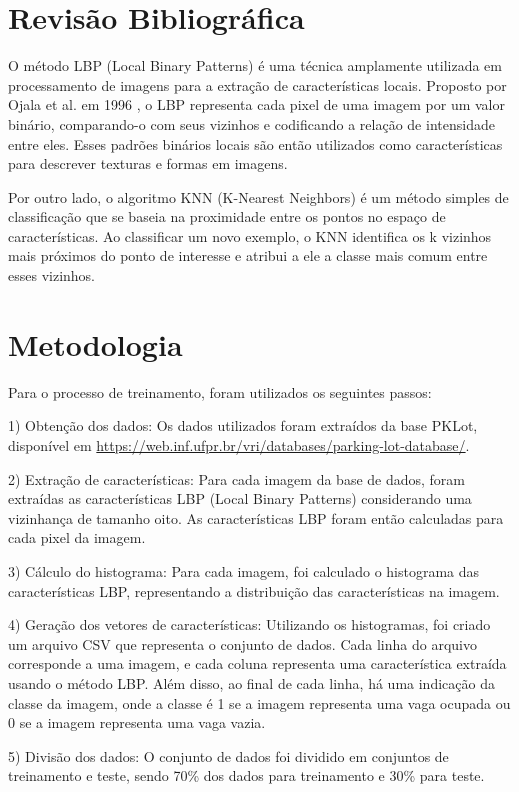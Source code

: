 \documentclass[lettersize,journal]{IEEEtran}
\begin{document}
\section{Revisão Bibliográfica}
O método LBP (Local Binary Patterns) é uma técnica amplamente utilizada em processamento de imagens para a extração de características locais. Proposto por Ojala et al. em 1996 \cite{ojala2002multiresolution}, o LBP representa cada pixel de uma imagem por um valor binário, comparando-o com seus vizinhos e codificando a relação de intensidade entre eles. Esses padrões binários locais são então utilizados como características para descrever texturas e formas em imagens.

Por outro lado, o algoritmo KNN (K-Nearest Neighbors) é um método simples de classificação que se baseia na proximidade entre os pontos no espaço de características. Ao classificar um novo exemplo, o KNN identifica os k vizinhos mais próximos do ponto de interesse e atribui a ele a classe mais comum entre esses vizinhos.

\section{Metodologia}

Para o processo de treinamento, foram utilizados os seguintes passos:

1) Obtenção dos dados: Os dados utilizados foram extraídos da base PKLot, disponível em \url{https://web.inf.ufpr.br/vri/databases/parking-lot-database/}.

2) Extração de características: Para cada imagem da base de dados, foram extraídas as características LBP (Local Binary Patterns) considerando uma vizinhança de tamanho oito. As características LBP foram então calculadas para cada pixel da imagem.

3) Cálculo do histograma: Para cada imagem, foi calculado o histograma das características LBP, representando a distribuição das características na imagem.

4) Geração dos vetores de características: Utilizando os histogramas, foi criado um arquivo CSV que representa o conjunto de dados. Cada linha do arquivo corresponde a uma imagem, e cada coluna representa uma característica extraída usando o método LBP. Além disso, ao final de cada linha, há uma indicação da classe da imagem, onde a classe é 1 se a imagem representa uma vaga ocupada ou 0 se a imagem representa uma vaga vazia.

5) Divisão dos dados: O conjunto de dados foi dividido em conjuntos de treinamento e teste, sendo 70\% dos dados para treinamento e 30\% para teste. 
\end{document}
